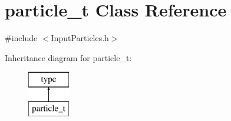 \hypertarget{classparticle__t}{\section{particle\-\_\-t Class Reference}
\label{classparticle__t}
}


{\ttfamily \#include $<$Input\-Particles.\-h$>$}

Inheritance diagram for particle\-\_\-t\-:\begin{figure}[H]
\begin{center}
\leavevmode
\includegraphics[height=2.000000cm]{classparticle__t}
\end{center}
\end{figure}
